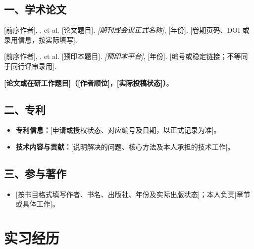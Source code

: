 \documentclass[chinese]{academic-cv}
\begin{document}
\subsection*{一、学术论文}

\begin{enumerate}[label={[\arabic*]},leftmargin=2em,labelsep=.55em,itemsep=5pt]
  \item {[前序作者]}, \cvname{[本人英文姓名]}, et al.
    [论文题目]. \textit{[期刊或会议正式名称]}, [年份]. [卷期页码、DOI 或录用信息，按实际填写].
  \item {[前序作者]}, \cvname{[本人英文姓名]}, et al.
    [预印本题目]. \textit{[预印本平台]}, [年份]. [编号或稳定链接；不等同于同行评审录用].
  \item \textbf{[论文或在研工作题目]（[作者顺位]，[实际投稿状态]）}。\par
    [研究问题与方法；本人完成的工作；已取得的结果及评价条件，可展开为两至三行。]
\end{enumerate}

\subsection*{二、专利}

\begingroup
\setlength{\resumedatewidth}{42mm}
\endgroup
\begin{itemize}
  \item \textbf{专利信息：}[申请或授权状态、对应编号及日期，以正式记录为准]。
  \item \textbf{技术内容与贡献：}[说明解决的问题、核心方法及本人承担的技术工作]。
\end{itemize}

\subsection*{三、参与著作}

\begin{itemize}
  \item {[按书目格式填写作者、书名、出版社、年份及实际出版状态]}；本人负责[章节或具体工作]。
\end{itemize}

\section{实习经历}
\end{document}
